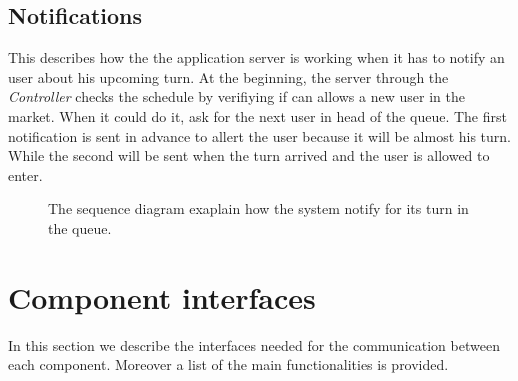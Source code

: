 \pagebreak

\subsection{Notifications}
This describes how the the application server is working when it has to notify an user about his upcoming turn. At the beginning, the server through the \textit{Controller} checks the schedule by verifiying if can allows a new user in the market. When it could do it, ask for the next user in head of the queue. The first notification is sent in advance to allert the user because it will be almost his turn. While the second will be sent when the turn arrived and the user is allowed to enter. 

\begin{figure}[H]
  \label{NotificationsSD}
  \centering
    \caption{The sequence diagram exaplain how the system notify for its turn in the queue.}
\end{figure} 

\pagebreak


\section{Component interfaces}
In this section we describe the interfaces needed for the communication between each component. Moreover a list of the main functionalities is provided.

